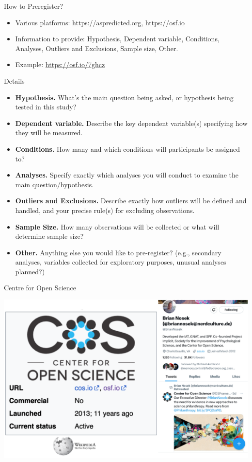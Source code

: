\documentclass[
  ignorenonframetext,
  aspectratio=169,
]{beamer}
\providecommand{\tightlist}{%
  \setlength{\itemsep}{0pt}\setlength{\parskip}{0pt}}\usepackage{longtable,booktabs,array}
\begin{document}
\begin{frame}{How to Preregister?}
\label{how-to-preregister}
\begin{itemize}
\tightlist
\item
  Various platforms: \url{https://aspredicted.org}, \url{https://osf.io}
\item
  Information to provide: Hypothesis, Dependent variable, Conditions,
  Analyses, Outliers and Exclusions, Sample size, Other.
\item
  Example: \url{https://osf.io/7ghcz}
\end{itemize}
\end{frame}

\begin{frame}{Details}
\label{details}
\begin{itemize}
\tightlist
\item
  \textbf{Hypothesis.} What's the main question being asked, or
  hypothesis being tested in this study?
\item
  \textbf{Dependent variable.} Describe the key dependent variable(s)
  specifying how they will be measured.
\item
  \textbf{Conditions.} How many and which conditions will participants
  be assigned to?
\item
  \textbf{Analyses.} Specify exactly which analyses you will conduct to
  examine the main question/hypothesis.
\item
  \textbf{Outliers and Exclusions.} Describe exactly how outliers will
  be defined and handled, and your precise rule(s) for excluding
  observations.
\item
  \textbf{Sample Size.} How many observations will be collected or what
  will determine sample size?
\item
  \textbf{Other.} Anything else you would like to pre-register? (e.g.,
  secondary analyses, variables collected for exploratory purposes,
  unusual analyses planned?)
\end{itemize}
\end{frame}

\begin{frame}{Centre for Open Science}
\label{centre-for-open-science}
\begin{center}
\includegraphics{figs/cos.png}
\end{center}
\end{frame}
\end{document}
